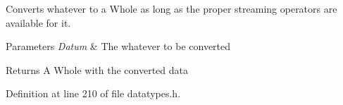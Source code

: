 Converts whatever to a Whole as long as the proper streaming operators are available for it. 


\begin{DoxyParams}{Parameters}
{\em Datum} & The whatever to be converted \\
\hline
\end{DoxyParams}
\begin{DoxyReturn}{Returns}
A Whole with the converted data 
\end{DoxyReturn}


Definition at line 210 of file datatypes.\-h.

